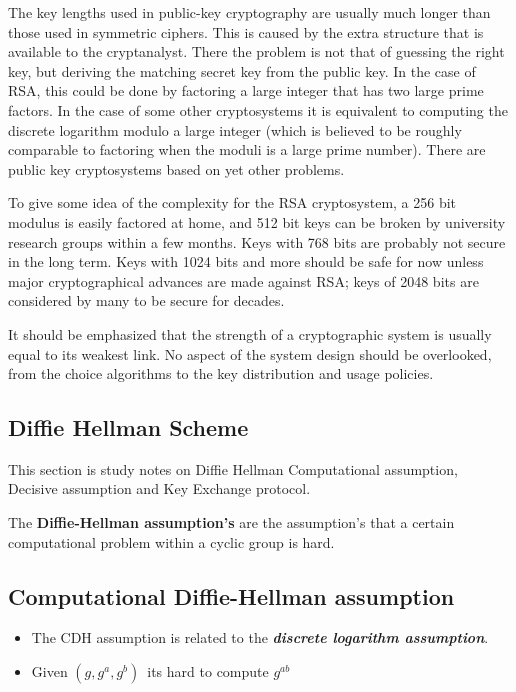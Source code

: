 \documentclass[12pt]{article}
\begin{document}
The key lengths used in public-key cryptography are usually much longer than those used in symmetric ciphers. This is caused by the extra structure that is available to the cryptanalyst. There the problem is not that of guessing the right key, but deriving the matching secret key from the public key. In the case of RSA, this could be done by factoring a large integer that has two large prime factors. In the case of some other cryptosystems it is equivalent to computing the discrete logarithm modulo a large integer (which is believed to be roughly comparable to factoring when the moduli is a large prime number). There are public key cryptosystems based on yet other problems.

To give some idea of the complexity for the RSA cryptosystem, a 256 bit modulus is easily factored at home, and 512 bit keys can be broken by university research groups within a few months. Keys with 768 bits are probably not secure in the long term. Keys with 1024 bits and more should be safe for now unless major cryptographical advances are made against RSA; keys of 2048 bits are considered by many to be secure for decades.

It should be emphasized that the strength of a cryptographic system is usually equal to its weakest link. No aspect of the system design should be overlooked, from the choice algorithms to the key distribution and usage policies.











%
%
\pagebreak
\vspace*{\fill}
\begin{center}
\section{Diffie Hellman Scheme}
This section is study notes on Diffie Hellman Computational assumption, Decisive assumption 
and Key Exchange protocol.
\end{center}
\vspace*{\fill}
\pagebreak
The \textbf{Diffie-Hellman assumption's} are the assumption's that a certain 
computational problem within a cyclic group is hard.
\subsection{Computational Diffie-Hellman assumption}
\begin{itemize}
\item The CDH assumption is related to the \textit{\textbf{discrete logarithm assumption}}.
\item Given $(g,g^a,g^b) \,$ its hard to compute $g^{ab}$
\end{itemize}
\end{document}
